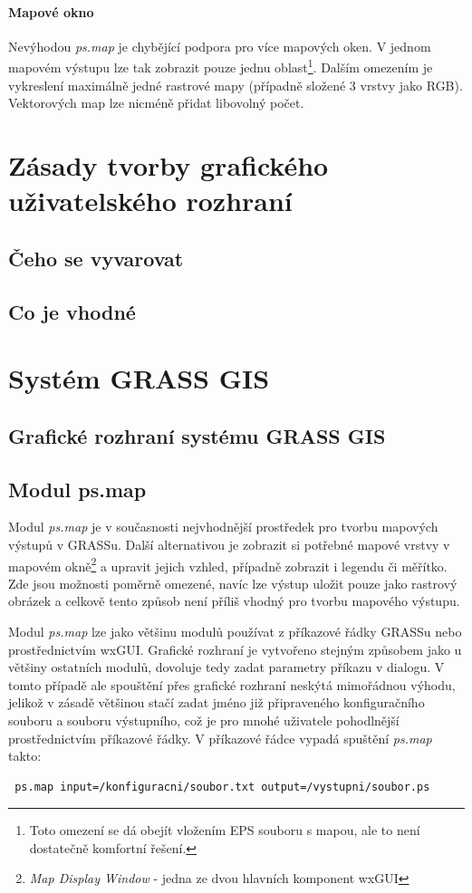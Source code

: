 \documentclass[a4paper,12pt,draft]{article}
\newcommand{\modul}[1]{\emph{#1}}
\begin{document}
\paragraph*{Mapové okno}
Nevýhodou \modul{ps.map} je chybějící podpora pro více mapových oken. V jednom mapovém výstupu lze tak zobrazit pouze jednu oblast\footnote{Toto omezení se dá obejít vložením EPS souboru s mapou, ale to není dostatečně komfortní řešení.}. Dalším omezením je vykreslení maximálně jedné rastrové mapy (případně složené 3 vrstvy jako RGB). Vektorových map lze nicméně přidat libovolný počet.


\section{Zásady tvorby grafického uživatelského rozhraní}
\subsection{Čeho se vyvarovat}
\subsection{Co je vhodné}


\section{Systém GRASS GIS}

\subsection{Grafické rozhraní systému GRASS GIS}

\subsection{Modul ps.map}
\label{sec:psmap}
Modul \modul{ps.map} je v současnosti nejvhodnější prostředek pro tvorbu mapových výstupů v GRASSu. Další alternativou je zobrazit si potřebné mapové vrstvy v mapovém okně\footnote{\emph{Map Display Window} - jedna ze dvou hlavních komponent wxGUI} a upravit jejich vzhled, případně zobrazit i legendu či měřítko. Zde jsou možnosti poměrně omezené, navíc lze výstup uložit pouze jako rastrový obrázek a celkově tento způsob není příliš vhodný pro tvorbu mapového výstupu.

Modul \modul{ps.map} lze jako většinu modulů používat z příkazové řádky GRASSu nebo pro\-střed\-nic\-tvím wxGUI. Grafické rozhraní je vytvořeno stejným způsobem jako u většiny ostatních modulů, dovoluje tedy zadat parametry příkazu v dialogu. V tomto případě ale spouštění přes grafické rozhraní neskýtá mimořádnou výhodu, jelikož v zásadě většinou stačí zadat jméno již připraveného konfiguračního souboru a souboru výstupního, což je pro mnohé uživatele pohodlnější prostřednictvím příkazové řádky. V příkazové řádce vypadá spuštění \modul{ps.map} takto:
\begin{verbatim}
 ps.map input=/konfiguracni/soubor.txt output=/vystupni/soubor.ps   
\end{verbatim}
\end{document}
